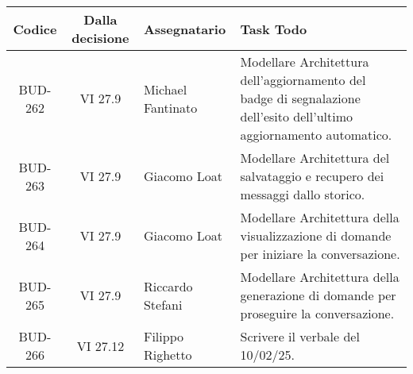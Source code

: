 \clearpage
\begin{table}[htbp]
    \centering
    \begin{tabular}{|c|c|p{}|p{}|}
        \hline
        \rowcolor[gray]{0.75}
        \textbf{Codice} & \textbf{Dalla decisione} & \textbf{Assegnatario} & \textbf{Task Todo} \\
        \hline
        BUD-262 & VI 27.9 & Michael Fantinato & Modellare Architettura dell'aggiornamento del badge di segnalazione dell'esito dell'ultimo aggiornamento automatico. \\
        \hline
        BUD-263 & VI 27.9 & Giacomo Loat & Modellare Architettura del salvataggio e recupero dei messaggi dallo storico. \\
        \hline
        BUD-264 & VI 27.9 & Giacomo Loat & Modellare Architettura della visualizzazione di domande per iniziare la conversazione. \\
        \hline
        BUD-265 & VI 27.9 & Riccardo Stefani & Modellare Architettura della generazione di domande per proseguire la conversazione. \\
        \hline
        BUD-266 & VI 27.12 & Filippo Righetto & Scrivere il verbale del 10/02/25. \\
        \hline
    \end{tabular}
    \end{table}